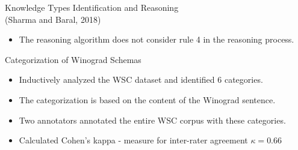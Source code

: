 \documentclass[svgnames, final, 20pt]{beamer} %
\begin{document}
\begin{frame}[fragile]
\begin{columns}[t]
\begin{block}{Knowledge Types Identification and Reasoning\\(Sharma and Baral, 2018)}
\begin{itemize}
\begin{beamercolorbox}[rounded=true,sep=0.3cm]{expcol}
Extracted knowledge: ``weak y prevents y lifts".\\
Knowledge type ``Property prevents Action"\\
ASP encoding:\\
\begin{lstlisting}[language = Prolog, style=SC, numbers=right,
numberstyle=\tiny]
has_k(weak_1,is_trait_of,y_2).
has_k(weak_1,instance_of,weak).
has_k(y_2,instance_of,entity).
has_k(weak_1,prevents,lifts_5).
has_k(lifts_5,instance_of,lift).
has_k(lifts_5,agent,y_2).
\end{lstlisting}
\end{beamercolorbox}
\item The reasoning algorithm {\color{myorange}does not consider} rule 4 in the reasoning process.
\end{itemize}

\begin{block}{Categorization of Winograd Schemas}
\justify 
\begin{itemize}
	\item Inductively analyzed the WSC dataset and identified {\color{myorange}6 categories}.
	\item The categorization is based on the {\color{myorange}content} of the Winograd sentence.
	\item Two annotators annotated the entire WSC corpus with these categories.
	\item Calculated Cohen's kappa - measure for inter-rater agreement $\kappa=0.66$
\end{itemize}
 
\vspace{1cm}
\end{block}
\end{block}
\end{columns}
\end{frame}
\end{document}

